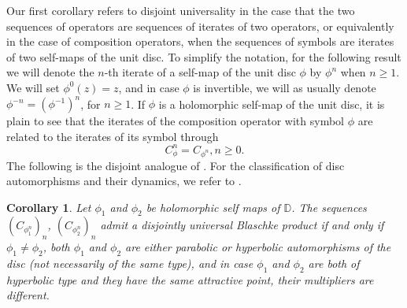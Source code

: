 \documentclass[12pt,a4paper]{amsart}
\theoremstyle{plain}
\newtheorem{corollary}[theorem]{Corollary}
\theoremstyle{definition}
\theoremstyle{remark}
\theoremstyle{fact}
\begin{document}
    Our first corollary refers to disjoint universality in the case that the two sequences of operators are sequences of iterates of two operators, or equivalently in the case of composition operators, when the sequences of symbols are iterates of two self-maps of the unit disc. To simplify the notation, for the following result we will denote the $n$-th iterate of a self-map of the unit disc $\phi$ by $\phi^n$ when $n\geq 1$. We will set $\phi^0(z)=z$, and in case $\phi$ is invertible, we will as usually denote $\phi^{-n}=(\phi^{-1})^n$, for $n\geq 1$. If $\phi$ is a holomorphic self-map of the unit disc, it is plain to see that the iterates of the composition operator with symbol $\phi$ are related to the iterates of its symbol through
    $$
    C_{\phi}^n=C_{\phi^n}, n\geq 0.
    $$
    The following is the disjoint analogue of \cite[Corollary 4.1]{BGGM09}. For the classification of disc automorphisms and their dynamics, we refer to \cite{Sh}.

    \begin{corollary}
        Let $\phi_1$ and $\phi_2$ be holomorphic self maps of $\mathbb{D}$. The sequences $(C_{\phi_1^n})_n$, $(C_{\phi_2^n})_n$ admit a disjointly universal Blaschke product if and only if $\phi_1\neq \phi_2$, both $\phi_1$ and $\phi_2$ are either parabolic or hyperbolic automorphisms of the disc (not necessarily of the same type), and in case $\phi_1$ and $\phi_2$ are both of hyperbolic type and they have the same attractive point, their multipliers are different.  
    \end{corollary}
\end{document}
